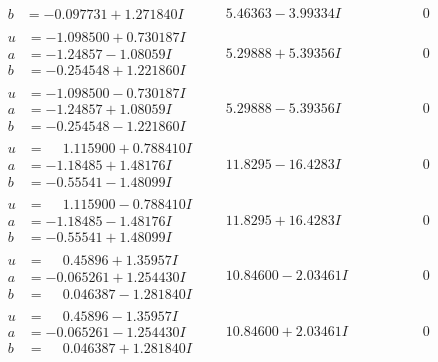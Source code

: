 \documentclass[1p]{elsarticle_modified}
\theoremstyle{definition}
\begin{document}
$$\begin{array}{c|c|c}
\begin{aligned}
b &= -0.097731 + 1.271840 I\end{aligned}
 & \phantom{-}5.46363 - 3.99334 I & \phantom{-0.000000 } 0 \\ \hline\begin{aligned}
u &= -1.098500 + 0.730187 I \\
a &= -1.24857 - 1.08059 I \\
b &= -0.254548 + 1.221860 I\end{aligned}
 & \phantom{-}5.29888 + 5.39356 I & \phantom{-0.000000 } 0 \\ \hline\begin{aligned}
u &= -1.098500 - 0.730187 I \\
a &= -1.24857 + 1.08059 I \\
b &= -0.254548 - 1.221860 I\end{aligned}
 & \phantom{-}5.29888 - 5.39356 I & \phantom{-0.000000 } 0 \\ \hline\begin{aligned}
u &= \phantom{-}1.115900 + 0.788410 I \\
a &= -1.18485 + 1.48176 I \\
b &= -0.55541 - 1.48099 I\end{aligned}
 & \phantom{-}11.8295 - 16.4283 I & \phantom{-0.000000 } 0 \\ \hline\begin{aligned}
u &= \phantom{-}1.115900 - 0.788410 I \\
a &= -1.18485 - 1.48176 I \\
b &= -0.55541 + 1.48099 I\end{aligned}
 & \phantom{-}11.8295 + 16.4283 I & \phantom{-0.000000 } 0 \\ \hline\begin{aligned}
u &= \phantom{-}0.45896 + 1.35957 I \\
a &= -0.065261 + 1.254430 I \\
b &= \phantom{-}0.046387 - 1.281840 I\end{aligned}
 & \phantom{-}10.84600 - 2.03461 I & \phantom{-0.000000 } 0 \\ \hline\begin{aligned}
u &= \phantom{-}0.45896 - 1.35957 I \\
a &= -0.065261 - 1.254430 I \\
b &= \phantom{-}0.046387 + 1.281840 I\end{aligned}
 & \phantom{-}10.84600 + 2.03461 I & \phantom{-0.000000 } 0 \\ \hline\begin{aligned}

\end{aligned}
\end{array}$$
\end{document}
